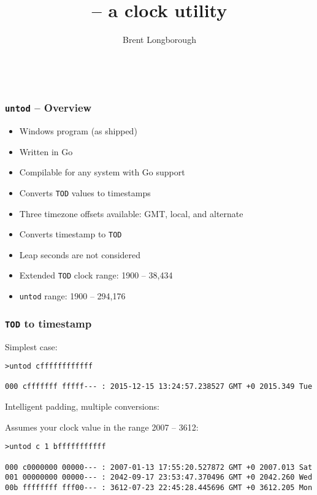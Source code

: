 \documentclass[10pt,xcolor=x11names]{beamer}
\title{\untod{} -- a \tod{} clock utility}
\author{Brent Longborough}
\date[\gitAuthorDate]{\gitAuthorDate\\\gitAbbrevHash}
\newcommand{\untod}{\texttt{untod}}
\newcommand{\tod}{\texttt{TOD}}
\begin{document}
\begin{frame}
\titlepage
\end{frame}
\begin{frame}
  \frametitle{\untod{} -- Overview}
  \begin{itemize}
  \item Windows program (as shipped)
  \item Written in Go
  \item Compilable for any system with Go support
  \item Converts \tod{} values to timestamps
  \item Three timezone offsets available: GMT, local, and alternate
  \item Converts timestamp to \tod{}
  \item Leap seconds are not considered
  \item Extended \tod{} clock range: 1900 -- 38,434
  \item \untod{} range: 1900 -- 294,176
  \end{itemize}
\end{frame}
\begin{frame}[fragile]
  \frametitle{\tod{} to timestamp}
  \begin{block}{Simplest case:}
    
  \begin{lstlisting}
>untod cffffffffffff

000 cfffffff fffff--- : 2015-12-15 13:24:57.238527 GMT +0 2015.349 Tue
  \end{lstlisting}
  \end{block}

  \begin{block}{Intelligent padding, multiple conversions:}

Assumes your clock value in the range 2007 -- 3612:

  \begin{lstlisting}
>untod c 1 bfffffffffff

000 c0000000 00000--- : 2007-01-13 17:55:20.527872 GMT +0 2007.013 Sat
001 00000000 00000--- : 2042-09-17 23:53:47.370496 GMT +0 2042.260 Wed
00b ffffffff fff00--- : 3612-07-23 22:45:28.445696 GMT +0 3612.205 Mon
  \end{lstlisting}
  \end{block}

\end{frame}
\end{document}
